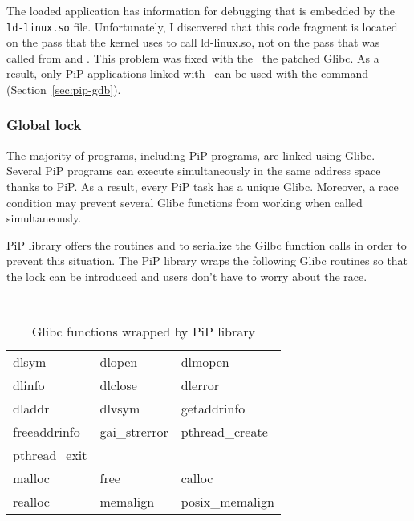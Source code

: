 \subsubsection{\pipgdb}

The loaded application has information for debugging that is embedded
by the {\tt ld-linux.so} file. Unfortunately, I discovered that this
code fragment is located on the pass that the kernel uses to call
ld-linux.so, not on the pass that was called from 
and . This problem was fixed with the \pipglibc\,
the patched Glibc. As a result, only PiP applications linked with
\pipglibc\ can be used with the  command
(Section~\ref{sec:pip-gdb}).  

\subsubsection{Global lock}

The majority of programs, including PiP programs, are linked using
Glibc. Several PiP programs can execute simultaneously in the same
address space thanks to PiP. As a result, every PiP task has a unique
Glibc. Moreover, a race condition may prevent several Glibc functions
from working when called simultaneously.  

PiP library offers the routines  and
 to serialize the Gilbc function calls in
order to prevent this situation. The PiP library wraps the following
Glibc routines so that the lock can be introduced and users don't have
to worry about the race.

\begin{table}[ht]
  \centering
  \caption{Glibc functions wrapped by PiP library}\label{tbl:pip-wrapper}
  \vspace{3mm}
  \tt
  \begin{tabular}{lll}
    \hline
    dlsym	&
    dlopen	&
    dlmopen	\\
    dlinfo	&
    dlclose	&
    dlerror	\\
    dladdr	&
    dlvsym	&
    getaddrinfo	\\
    freeaddrinfo &
    gai_strerror &
    pthread_create \\
    \hline
    pthread_exit \\
    \hline
    malloc 	&
    free	&
    calloc	\\
    realloc	&
    memalign 	&
    posix_memalign \\
    \hline
  \end{tabular}
\end{table}

